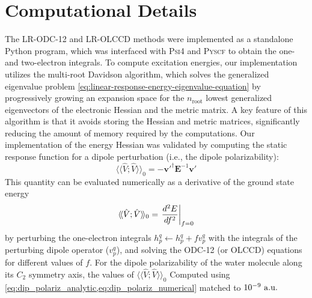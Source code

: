 \section{Computational Details}
\label{sec:comp_details}
The LR-ODC-12 and LR-OLCCD methods were implemented as a standalone Python
program, which was interfaced with \textsc{Psi4}\cite{Parrish:2017p3185} and
\textsc{Pyscf}\cite{Sun:2018pe1340} to obtain the one- and two-electron
integrals.
To compute excitation energies, our implementation utilizes the multi-root
Davidson algorithm,\cite{Davidson:1975p87,Liu:1978p49} which solves the
generalized eigenvalue problem
\eqref{eq:linear-response-energy-eigenvalue-equation} by progressively growing
an expansion space for the \(n_\mathrm{root}\) lowest generalized eigenvectors
of the electronic Hessian and the metric matrix.
A key feature of this algorithm is that it avoids storing the Hessian and metric
matrices, significantly reducing the amount of memory required by the
computations.
Our implementation of the energy Hessian was validated by computing the static
response function for a dipole perturbation (i.e., the dipole polarizability):
\begin{equation}
\label{eq:dip_polariz_analytic}
    \langle\!\langle\hat{V}; \hat{V}\rangle\!\rangle_0
    =
    -
    \mathbf{v}'^\dagger
    \mathbf{E}^{-1}
    \mathbf{v}'
\end{equation}
This quantity can be evaluated numerically as a derivative of the ground state energy
\begin{equation}
\label{eq:dip_polariz_numerical}
    \langle\!\langle\hat{V}; \hat{V}\rangle\!\rangle_0
    =
    \left.
    \frac{%
        d^2 E
    }{%
        df^2
    }
    \right|_{f=0}
\end{equation}
by perturbing the one-electron integrals
\(
    h_p^q
    \leftarrow
    h_p^q
    +
    f
    v_p^q
\)
with the integrals of the perturbing dipole operator (\(v_p^q\)), and solving the
ODC-12 (or OLCCD) equations for different values of \(f\).
For the dipole polarizability of the water molecule along its \(C_2\) symmetry
axis, the values of $\langle\!\langle\hat{V}; \hat{V}\rangle\!\rangle_0$
Computed using \cref{eq:dip_polariz_analytic,eq:dip_polariz_numerical} matched
to \(10^{-9}\ \mathrm{a.u.}\)

